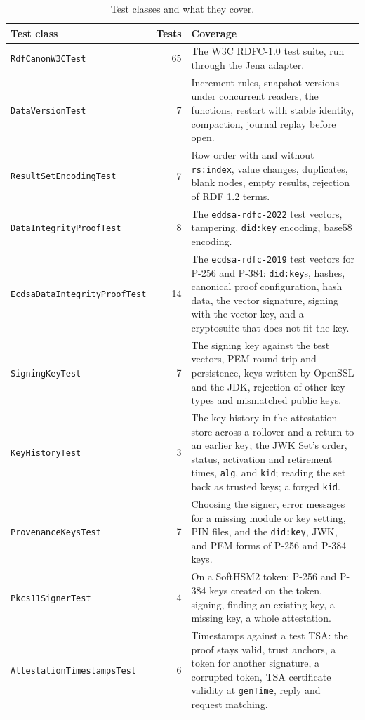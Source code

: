 \documentclass[11pt,a4paper]{article}
\newcommand{\code}[1]{\texttt{#1}}
\begin{document}
\begin{table}[htbp]
\centering
\caption{Test classes and what they cover.}
\label{tab:tests}
\footnotesize
\begin{tabularx}{\linewidth}{@{}>{\raggedright\arraybackslash}p{50mm}r>{\raggedright\arraybackslash}X@{}}
\toprule
Test class & Tests & Coverage \\
\midrule
\code{RdfCanonW3CTest} & 65 & The W3C RDFC-1.0 test suite, run through the Jena adapter. \\
\code{DataVersionTest} & 7 & Increment rules, snapshot versions under concurrent readers,
the functions, restart with stable identity, compaction, journal replay before open. \\
\code{ResultSetEncodingTest} & 7 & Row order with and without \code{rs:index}, value changes,
duplicates, blank nodes, empty results, rejection of RDF 1.2 terms. \\
\code{DataIntegrityProofTest} & 8 & The \code{eddsa-rdfc-2022} test vectors, tampering,
\code{did:key} encoding, base58 encoding. \\
\code{EcdsaDataIntegrityProofTest} & 14 & The \code{ecdsa-rdfc-2019} test vectors for P-256
and P-384: \code{did:key}s, hashes, canonical proof configuration, hash data, the vector
signature, signing with the vector key, and a cryptosuite that does not fit the key. \\
\code{SigningKeyTest} & 7 & The signing key against the test vectors, PEM round trip and
persistence, keys written by OpenSSL and the JDK, rejection of other key types and mismatched
public keys. \\
\code{KeyHistoryTest} & 3 & The key history in the attestation store across a rollover and a
return to an earlier key; the JWK Set's order, status, activation and retirement times,
\code{alg}, and \code{kid}; reading the set back as trusted keys; a forged \code{kid}. \\
\code{ProvenanceKeysTest} & 7 & Choosing the signer, error messages for a missing module or key
setting, PIN files, and the \code{did:key}, JWK, and PEM forms of P-256 and P-384 keys. \\
\code{Pkcs11SignerTest} & 4 & On a SoftHSM2 token: P-256 and P-384 keys created on the token,
signing, finding an existing key, a missing key, a whole attestation. \\
\code{AttestationTimestampsTest} & 6 & Timestamps against a test TSA: the proof stays valid,
trust anchors, a token for another signature, a corrupted token, TSA certificate validity at
\code{genTime}, reply and request matching. \\

\end{tabularx}
\end{table}
\end{document}
